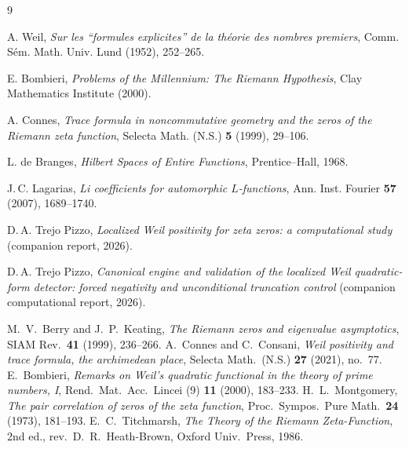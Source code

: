 \documentclass[11pt]{amsart}
\theoremstyle{definition}
\theoremstyle{remark}
\begin{document}
\begin{thebibliography}{9}

 A. Weil, \emph{Sur les ``formules explicites'' de la
th\'eorie des nombres premiers}, Comm. S\'em. Math. Univ. Lund (1952),
252--265.

 E. Bombieri, \emph{Problems of the Millennium: The
Riemann Hypothesis}, Clay Mathematics Institute (2000).

 A. Connes, \emph{Trace formula in noncommutative
geometry and the zeros of the Riemann zeta function}, Selecta Math. (N.S.)
\textbf{5} (1999), 29--106.

 L. de Branges, \emph{Hilbert Spaces of Entire
Functions}, Prentice--Hall, 1968.

 J.\,C. Lagarias, \emph{Li coefficients for automorphic
$L$-functions}, Ann. Inst. Fourier \textbf{57} (2007), 1689--1740.

 D.\,A. Trejo Pizzo, \emph{Localized Weil positivity for
zeta zeros: a computational study} (companion report, 2026).

 D.\,A. Trejo Pizzo, \emph{Canonical engine and validation
of the localized Weil quadratic-form detector: forced negativity and
unconditional truncation control} (companion computational report, 2026).

 M.~V.~Berry and J.~P.~Keating, \emph{The Riemann zeros and eigenvalue asymptotics}, SIAM Rev.\ \textbf{41} (1999), 236--266.
 A.~Connes and C.~Consani, \emph{Weil positivity and trace formula, the archimedean place}, Selecta Math.\ (N.S.) \textbf{27} (2021), no.~77.
 E.~Bombieri, \emph{Remarks on Weil's quadratic functional in the theory of prime numbers, I}, Rend.\ Mat.\ Acc.\ Lincei (9) \textbf{11} (2000), 183--233.
 H.~L.~Montgomery, \emph{The pair correlation of zeros of the zeta function}, Proc.\ Sympos.\ Pure Math.\ \textbf{24} (1973), 181--193.
 E.~C.~Titchmarsh, \emph{The Theory of the Riemann Zeta-Function}, 2nd ed., rev.\ D.~R.~Heath-Brown, Oxford Univ.\ Press, 1986.
\end{thebibliography}
\end{document}
